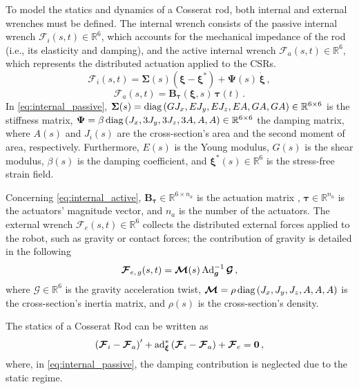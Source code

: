 To model the statics and dynamics of a Cosserat rod, both internal and external wrenches must be defined. The internal wrench consists of the passive internal wrench $\bm{\mathcal{F}}_i(s, t) \in \mathbb{R}^6$, which accounts for the mechanical impedance of the rod (i.e., its elasticity and damping), and the active internal wrench $\bm{\mathcal{F}}_a(s, t) \in \mathbb{R}^6$, which represents the distributed actuation applied to the \acp{CSR}.
\begin{equation} \label{eq:internal_passive}
    \bm{\mathcal{F}}_i (s, t) = \bm{\Sigma}(s) \left(\bm{\xi} - \bm{\xi}^*\right) + \bm{\Psi}(s) \, \dot{\bm{\xi}} \, ,
\end{equation}
\begin{equation} \label{eq:internal_active}
    \bm{\mathcal{F}}_a(s, t) = \bm{B}_{\bm{\tau}}(\bm{\xi}, s) \, \bm{\tau}(t) \, .
\end{equation}
%
In \eqref{eq:internal_passive}, $\bm{\Sigma}(s) = \textnormal{diag} \left(G J_x, E J_y, E J_z, E A, G A, G A \right) \in \mathbb{R}^{6 \times 6}$ is the stiffness matrix, $\bm{\Psi} = \beta  \, \textnormal{diag} \left(J_x, 3 J_y, 3 J_z, 3 A, A, A \right) \in \mathbb{R}^{6 \times 6}$ the damping matrix, where $A(s)$ and $J_i(s)$ are the cross-section's area and the second moment of area, respectively. 
Furthermore, $E(s)$ is the Young modulus, $G(s)$ is the shear modulus, $\beta(s)$ is the damping coefficient, and $\bm{\xi}^{*}(s) \in \mathbb{R}^{6}$ is the stress-free strain field.

Concerning \eqref{eq:internal_active}, $\bm{B}_{\bm{\tau}} \in \mathbb{R}^{6 \times n_a}$ is the actuation matrix \cite{renda2017screw}, $\bm{\tau} \in \mathbb{R}^{n_a}$ is the actuators' magnitude vector, and $n_a$ is the number of the actuators.
The external wrench $\bm{\mathcal{F}}_e(s, t) \in \mathbb{R}^6$ collects the distributed external forces applied to the robot, such as gravity or contact forces; the contribution of gravity is detailed in the following
\begin{equation} \label{eq:ext_gravity}
    \bm{\mathcal{F}}_{e, \, g}(s, t) = \bm{\mathcal{M}}(s) \, \textnormal{Ad}^{-1}_{\bm{g}} \, \bm{\mathcal{G}} \, ,
\end{equation}
where $\bm{\mathcal{G}} \in \mathbb{R}^{6}$ is the gravity acceleration twist, $\bm{\mathcal{M}} = \rho \, \textnormal{diag}\left(J_x, J_y, J_z, A, A, A\right)$ is the cross-section's inertia matrix, and $\rho(s)$ is the cross-section's density.

The statics of a Cosserat Rod can be written as
\begin{equation} \label{eq:crt_statics}
    \left(\bm{\mathcal{F}}_i - \bm{\mathcal{F}}_a\right)' + \textnormal{ad}_{\bm{\xi}}^{*} \left(\bm{\mathcal{F}}_i - \bm{\mathcal{F}}_a\right) + \bm{\mathcal{F}}_e = \bm{0} \, ,
\end{equation}
where, in \eqref{eq:internal_passive}, the damping contribution is neglected due to the static regime.

